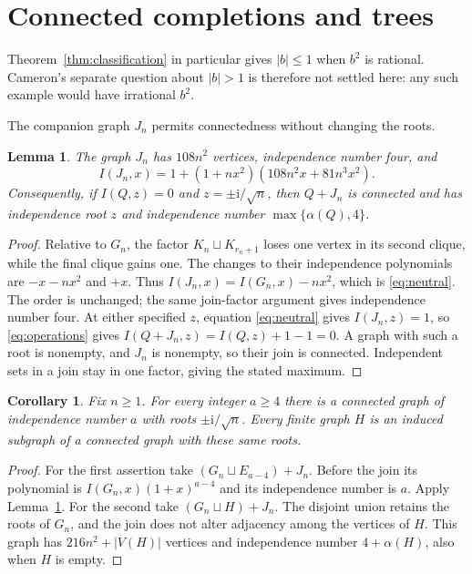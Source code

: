 \documentclass[11pt]{article}
\newtheorem{lemma}[theorem]{Lemma}
\newtheorem{corollary}[theorem]{Corollary}
\newcommand{\ii}{\mathrm{i}}
\begin{document}
\section{Connected completions and trees}
Theorem~\ref{thm:classification} in particular gives $|b|\leq1$ when
$b^2$ is rational. Cameron's separate question about $|b|>1$
\cite[fourth question]{CameronQ} is therefore not settled here:
any such example would have irrational $b^2$.

The companion graph $J_n$ permits connectedness without changing the roots.
\begin{lemma}\label{lem:neutral}
The graph $J_n$ has $108n^2$ vertices, independence number four, and
\begin{equation}\label{eq:neutral}
 I(J_n,x)=1+(1+nx^2)(108n^2x+81n^3x^2).
\end{equation}
Consequently, if $I(Q,z)=0$ and $z=\pm\ii/\sqrt n$, then $Q+J_n$
is connected and has independence root $z$ and independence number
$\max\{\alpha(Q),4\}$.
\end{lemma}
\begin{proof}
Relative to $G_n$, the factor $K_n\sqcup K_{r_n+1}$ loses one vertex
in its second clique, while the final clique gains one. The changes
to their independence polynomials are $-x-nx^2$ and $+x$.
Thus $I(J_n,x)=I(G_n,x)-nx^2$, which is \eqref{eq:neutral}.
The order is unchanged; the same join-factor argument gives independence
number four. At either specified $z$, equation \eqref{eq:neutral}
gives $I(J_n,z)=1$, so \eqref{eq:operations} gives
$I(Q+J_n,z)=I(Q,z)+1-1=0$.
A graph with such a root is nonempty, and $J_n$ is nonempty, so their
join is connected. Independent sets in a join stay in one factor,
giving the stated maximum.
\end{proof}

\begin{corollary}\label{cor:completion}
Fix $n\geq1$.
For every integer $a\geq4$ there is a connected graph of independence
number $a$ with roots $\pm\ii/\sqrt n$.
Every finite graph $H$ is an induced subgraph of a connected graph
with these same roots.
\end{corollary}
\begin{proof}
For the first assertion take
$(G_n\sqcup E_{a-4})+J_n$.
Before the join its polynomial is $I(G_n,x)(1+x)^{a-4}$ and its
independence number is $a$. Apply Lemma~\ref{lem:neutral}.
For the second take $(G_n\sqcup H)+J_n$.
The disjoint union retains the roots of $G_n$, and the join does not
alter adjacency among the vertices of $H$.
This graph has $216n^2+|V(H)|$ vertices and independence number
$4+\alpha(H)$, also when $H$ is empty.
\end{proof}
\end{document}
